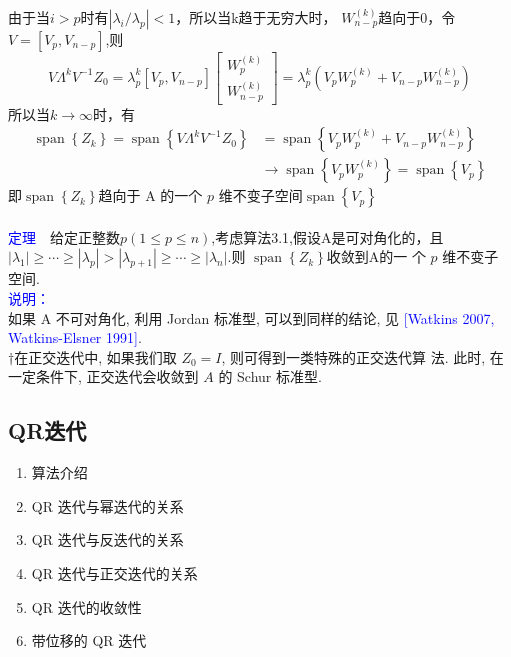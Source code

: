 \documentclass[12pt,a4paper]{article}
\begin{document}
	由于当$i>p$时有$\left|\lambda_{i} / \lambda_{p}\right|<1$，所以当k趋于无穷大时，
	$W_{n-p}^{(k)}$趋向于0，令$V=\left[V_{p}, V_{n-p}\right]$,则
	$$V \Lambda^{k} V^{-1} Z_{0}=\lambda_{p}^{k}\left[V_{p}, V_{n-p}\right]\left[\begin{array}{c}{W_{p}^{(k)}} \\ {W_{n-p}^{(k)}}\end{array}\right]=\lambda_{p}^{k}\left(V_{p} W_{p}^{(k)}+V_{n-p} W_{n-p}^{(k)}\right)$$
	所以当$k \rightarrow \infty$时，有
	$$
	\begin{aligned} \operatorname{span}\left\{Z_{k}\right\}=\operatorname{span}\left\{V \Lambda^{k} V^{-1} Z_{0}\right\} &=\operatorname{span}\left\{V_{p} W_{p}^{(k)}+V_{n-p} W_{n-p}^{(k)}\right\} \\ & \rightarrow \operatorname{span}\left\{V_{p} W_{p}^{(k)}\right\}=\operatorname{span}\left\{V_{p}\right\} \end{aligned}
	$$
	即$\operatorname{span}\left\{Z_{k}\right\}$趋向于 A 的一个 $p$ 维不变子空间$\operatorname{span}\left\{V_{p}\right\}$\\
	\\
	\textcolor{blue}{定理}~~给定正整数$p(1 \leq p \leq n)$,考虑算法3.1,假设A是可对角化的，且$\left|\lambda_{1}\right| \geq \cdots \geq\left|\lambda_{p}\right|>\left|\lambda_{p+1}\right| \geq \cdots \geq\left|\lambda_{n}\right|$.则
	$\operatorname{span}\left\{Z_{k}\right\}$收敛到A的一 个 $p$ 维不变子空间.\\
	\textcolor{blue}{说明：}\\
	如果 A 不可对角化, 利用 Jordan 标准型, 可以到同样的结论, 见 \textcolor{blue}{[Watkins 2007, Watkins-Elsner 1991]}.\\
	$\dagger$在正交迭代中, 如果我们取 $Z_{0} = I$, 则可得到一类特殊的正交迭代算 法. 此时, 在一定条件下, 正交迭代会收敛到 $A$ 的 Schur 标准型.
	\subsection{QR迭代}
	\begin{enumerate}[4.1]
		\item 算法介绍
		\item  QR 迭代与幂迭代的关系
		\item  QR 迭代与反迭代的关系
		\item  QR 迭代与正交迭代的关系
		\item  QR 迭代的收敛性
		\item  带位移的 QR 迭代
	\end{enumerate}
\end{document}
